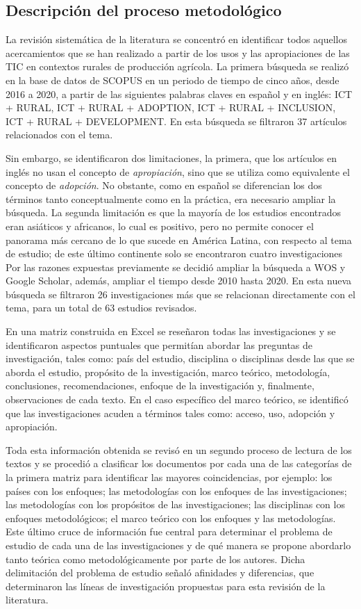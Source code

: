 \documentclass[spanish]{textolivre}
\begin{document}
\subsection{Descripción del proceso metodológico}

La revisión sistemática de la literatura se concentró en identificar todos aquellos acercamientos que se han realizado a partir de los usos y las apropiaciones de las TIC en contextos rurales de producción agrícola. La primera búsqueda se realizó en la base de datos de SCOPUS en un periodo de tiempo de cinco años, desde 2016 a 2020, a partir de las siguientes palabras claves en español y en inglés: ICT + RURAL, ICT + RURAL + ADOPTION, ICT + RURAL + INCLUSION, ICT + RURAL + DEVELOPMENT. En esta búsqueda se filtraron 37 artículos relacionados con el tema.

Sin embargo, se identificaron dos limitaciones, la primera, que los artículos en inglés no usan el concepto de \textit{apropiación}, sino que se utiliza como equivalente el concepto de \textit{adopción}. No obstante, como en español se diferencian los dos términos tanto conceptualmente como en la práctica, era necesario ampliar la búsqueda. La segunda limitación es que la mayoría de los estudios encontrados eran asiáticos y africanos, lo cual es positivo, pero no permite conocer el panorama más cercano de lo que sucede en América Latina, con respecto al tema de estudio; de este último continente solo se encontraron cuatro investigaciones Por las razones expuestas previamente se decidió ampliar la búsqueda a WOS y Google Scholar, además, ampliar el tiempo desde 2010 hasta 2020. En esta nueva búsqueda se filtraron 26 investigaciones más que se relacionan directamente con el tema, para un total de 63 estudios revisados. 

En una matriz construida en Excel se reseñaron todas las investigaciones y se identificaron aspectos puntuales que permitían abordar las preguntas de investigación, tales como: país del estudio, disciplina o disciplinas desde las que se aborda el estudio, propósito de la investigación, marco teórico, metodología, conclusiones, recomendaciones, enfoque de la investigación y, finalmente, observaciones de cada texto. En el caso específico del marco teórico, se identificó que las investigaciones acuden a términos tales como: acceso, uso, adopción y apropiación. 

Toda esta información obtenida se revisó en un segundo proceso de lectura de los textos y se procedió a clasificar los documentos por cada una de las categorías de la primera matriz para identificar las mayores coincidencias, por ejemplo: los países con los enfoques; las metodologías con los enfoques de las investigaciones; las metodologías con los propósitos de las investigaciones; las disciplinas con los enfoques metodológicos; el marco teórico con los enfoques y las metodologías. Este último cruce de información fue central para determinar el problema de estudio de cada una de las investigaciones y de qué manera se propone abordarlo tanto teórica como metodológicamente por parte de los autores. Dicha delimitación del problema de estudio señaló afinidades y diferencias, que determinaron las líneas de investigación propuestas para esta revisión de la literatura. 
\end{document}
